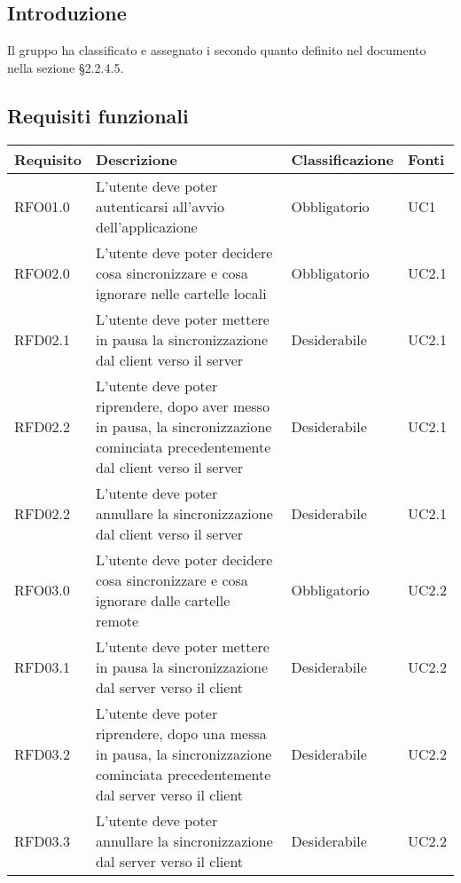 \subsection{Introduzione}
Il gruppo \gruppo{} ha classificato e assegnato i  secondo quanto definito nel documento \NdP{} \versNdP{} nella sezione \S{}2.2.4.5.

\subsection{Requisiti funzionali}
{
    \setlength{\freewidth}{\dimexpr\textwidth-8\tabcolsep}
    \renewcommand{\arraystretch}{1.5}
    \centering
    \setlength{\aboverulesep}{0pt}
    \setlength{\belowrulesep}{0pt}
    \begin{longtable}{C{.20\freewidth} C{.40\freewidth} C{.20\freewidth} C{.20\freewidth}}
        \toprule 
        \textbf{Requisito} & \textbf{Descrizione} & \textbf{Classificazione} & \textbf{Fonti} \\
        \toprule
        \endhead

        RFO01.0  & L'utente deve poter autenticarsi all'avvio dell'applicazione & Obbligatorio & UC1 \\

        RFO02.0  & L'utente deve poter decidere cosa sincronizzare e cosa ignorare nelle cartelle locali & Obbligatorio & UC2.1 \\
        RFD02.1  & L'utente deve poter mettere in pausa la sincronizzazione dal client verso il server & Desiderabile & UC2.1 \\
        RFD02.2  & L'utente deve poter riprendere, dopo aver messo in pausa, la sincronizzazione cominciata precedentemente dal client verso il server & Desiderabile & UC2.1 \\
        RFD02.2  & L'utente deve poter annullare la sincronizzazione dal client verso il server & Desiderabile & UC2.1 \\

        RFO03.0  & L'utente deve poter decidere cosa sincronizzare e cosa ignorare dalle cartelle remote & Obbligatorio & UC2.2 \\
        RFD03.1  & L'utente deve poter mettere in pausa la sincronizzazione dal server verso il client & Desiderabile & UC2.2 \\
        RFD03.2  & L'utente deve poter riprendere, dopo una messa in pausa, la sincronizzazione cominciata precedentemente dal server verso il client & Desiderabile & UC2.2 \\
        RFD03.3  & L'utente deve poter annullare la sincronizzazione dal server verso il client & Desiderabile & UC2.2 \\


\end{longtable}}
